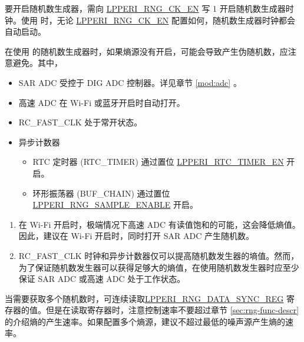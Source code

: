 \documentclass[main\_\_CN.tex]{subfiles}
\begin{document}
要开启随机数生成器，需向 \hyperref[fielddesc:LPPERIRNGCKEN]{LPPERI\_RNG\_CK\_EN} 写 1 开启随机数生成器时钟。使用  时，无论 \hyperref[fielddesc:LPPERIRNGCKEN]{LPPERI\_RNG\_CK\_EN} 配置如何，随机数生成器时钟都会自动启动。

在使用 \chipname{} 的随机数生成器时，如果熵源没有开启，可能会导致产生伪随机数，应注意避免。其中，
\begin{itemize}
    \item SAR ADC 受控于 DIG ADC 控制器。详见章节 \ref{mod:adc} \textit{}。
    \item 高速 ADC 在 Wi-Fi 或蓝牙开启时自动打开。
    \item RC\_FAST\_CLK 处于常开状态。
    \item 异步计数器
        \begin{itemize}
            \item RTC 定时器 (RTC\_TIMER) 通过置位 \hyperref[fielddesc:LPPERIRTCTIMEREN]{LPPERI\_RTC\_TIMER\_EN} 开启。
            \item 环形振荡器 (BUF\_CHAIN) 通过置位 \hyperref[fielddesc:LPPERIRNGSAMPLEENABLE]{LPPERI\_RNG\_SAMPLE\_ENABLE} 开启。
        \end{itemize}
\end{itemize}
\newpage
\begin{tiplisting}
\vspace{-2.5em}
\begin{enumerate}
    \label{others:rng-note-clock-seed}
    \item 在 Wi-Fi 开启时，极端情况下高速 ADC 有读值饱和的可能，这会降低熵值。因此，建议在 Wi-Fi 开启时，同时打开 SAR ADC 产生随机数。
    \item RC\_FAST\_CLK 时钟和异步计数器仅可以提高随机数发生器的墒值。然而，为了保证随机数发生器可以获得足够大的熵值，在使用随机数发生器时应至少保证 SAR ADC 或高速 ADC 处于工作状态。
\end{enumerate}
\end{tiplisting}

当需要获取多个随机数时，可连续读取\hyperref[regdesc:LPPERIRNGSYNCDATAREG]{LPPERI\_RNG\_DATA\_SYNC\_REG} 寄存器的值。但是在读取寄存器时，注意控制速率不要超过章节 \ref{sec:rng-func-descr} 的介绍熵的产生速率。如果配置多个熵源，建议不超过最低的噪声源产生熵的速率。
\end{document}
